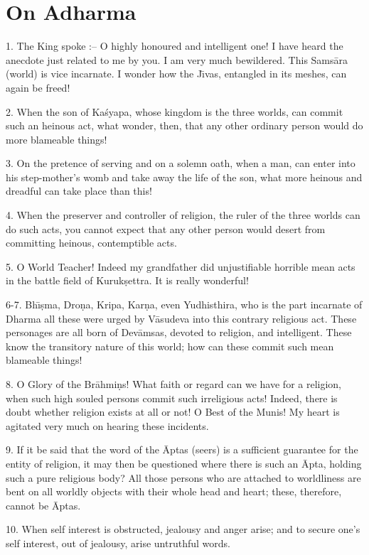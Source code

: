 \chapter{On Adharma}

1. The King spoke :-- O highly honoured and intelligent one! I have heard the anecdote just related to me by you. I am very much bewildered. This Sams\=ara (world) is vice incarnate. I wonder how the J\={\i}vas, entangled in its meshes, can again be freed!

2. When the son of Ka\'syapa, whose kingdom is the three worlds, can commit such an heinous act, what wonder, then, that any other ordinary person would do more blameable things!

3. On the pretence of serving and on a solemn oath, when a man, can enter into his step-mother's womb and take away the life of the son, what more heinous and dreadful can take place than this!

4. When the preserver and controller of religion, the ruler of the three worlds can do such acts, you cannot expect that any other person would desert from committing heinous, contemptible acts.

5. O World Teacher! Indeed my grandfather did unjustifiable horrible mean acts in the battle field of Kuruk\d{s}ettra. It is really wonderful!

6-7. Bh\={\i}\d{s}ma, Dro\d{n}a, Kripa, Kar\d{n}a, even Yudhisthira, who is the part incarnate of Dharma all these were urged by V\=asudeva into this contrary religious act. These personages are all born of Dev\=amsas, devoted to religion, and intelligent. These know the transitory nature of this world; how can these commit such mean blameable things!

8. O Glory of the Br\=ahmi\d{n}s! What faith or regard can we have for a religion, when such high souled persons commit such irreligious acts! Indeed, there is doubt whether religion exists at all or not! O Best of the Munis! My heart is agitated very much on hearing these incidents.

9. If it be said that the word of the \=Aptas (seers) is a sufficient guarantee for the entity of religion, it may then be questioned where there is such an \=Apta, holding such a pure religious body? All those persons who are attached to worldliness are bent on all worldly objects with their whole head and heart; these, therefore, cannot be \=Aptas.

10. When self interest is obstructed, jealousy and anger arise; and to secure one's self interest, out of jealousy, arise untruthful words.

